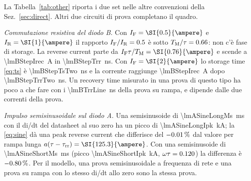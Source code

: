 \documentclass[10pt,a4paper]{scrartcl}
\let\newcommand\pdvaluedefine
\newcommand{\IF}{I_\mathrm{F}}
\newcommand{\IR}{I_\mathrm{R}}
\newcommand{\taurr}{\tau_\mathrm{rr}}
\newcommand{\TM}{T_\mathrm{M}}
\begin{document}
La Tabella~\ref{tab:other} riporta i due set nelle altre convenzioni della Sez.~\ref{sec:direct}. Altri due circuiti di prova completano il quadro.

\emph{Commutazione resistiva del diodo B.} Con $\IF = \SI{\lmBStepIf}{\ampere}$ e $\IR = \SI{\lmBStepIr}{\ampere}$ il rapporto $\IF/\IR = \lmBStepRatio$ è sotto $\TM/\tau = \lmBTmOverTau$: non c'è fase di storage. La reverse current parte da $\IF\tau/\TM = \SI{\lmBStepIzero}{\ampere}$ e scende a \SI{\lmBStepIrec}{\ampere} in \SI{\lmBStepTrr}{\nano\second}. Con $\IF = \SI{\lmBStepIfTwo}{\ampere}$ lo storage time \eqref{eq:ts} è \SI{\lmBStepTsTwo}{\nano\second} e la corrente raggiunge \SI{\lmBStepIrec}{\ampere} dopo \SI{\lmBStepTrrTwo}{\nano\second}. Un recovery time misurato in una prova di questo tipo ha poco a che fare con i \SI{\lmBTrrLine}{\nano\second} della prova su rampa, e dipende dalle due correnti della prova.

\emph{Impulso semisinusoidale sul diodo A.} Una semisinusoide di \SI{\lmASineLongMs}{\milli\second} con il di/dt del datasheet al suo zero ha un picco di \SI{\lmASineLongIpk}{\kilo\ampere}; la \eqref{eq:sine} dà una peak reverse current che differisce del $-0.01\,\%$ dal valore per rampa lunga $a(\tau-\taurr) = \SI{\lmALongIrr}{\ampere}$. Con una semisinusoide di \SI{\lmASineShortMs}{\milli\second} (picco \SI{\lmASineShortIpk}{\kilo\ampere}, $\omega\tau = 0.120$) la differenza è $-0.80\,\%$. Per il modello, una prova semisinusoidale a frequenza di rete e una prova su rampa con lo stesso di/dt allo zero sono la stessa prova.
\end{document}
